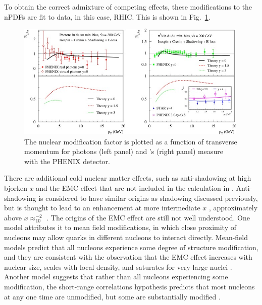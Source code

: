 To obtain the correct admixture of competing effects, these modifications to the nPDFs are fit to data, in this case, RHIC. This is shown in Fig.~\ref{fig:CNM_calc}. 

  \begin{figure}[htpb]
    \centering
    \includegraphics[width=0.99\textwidth]{CNM_cal.jpg}
    \caption{The nuclear modification factor is plotted as a function of transverse momentum for photons (left panel) and \pizero's (right panel) measure with the PHENIX detector.\cite{Kang2012}}
    \label{fig:CNM_calc}
  \end{figure}

  There are additional cold nuclear matter effects, such as anti-shadowing at high bjorken-$x$ and the EMC effect that are not included in the calculation in \cite{Kang2012}. Anti-shadowing is considered to have similar origins as shadowing discussed previously, but is thought to lead to an enhancement at more intermediate $x$ \cite{Brodsky1990a}, approximately above $x\approx_10^{-2}$ \cite{epps16:2017}. The origins of the EMC effect are still not well understood. One model attributes it to mean field modifications, in which close proximity of nucleons may allow quarks in different nucleons to interact directly. Mean-field models predict that all nucleons experience some degree of structure modification, and they are consistent with the observation that the EMC effect increases with nuclear size, scales with local density, and saturates for very large nuclei \cite{Hen2017a}. Another model suggests that rather than all nucleons experiencing some modification, the short-range correlations hypothesis predicts that most nucleons at any one time are unmodified, but some are substantially modified \cite{Norton2003a}.

